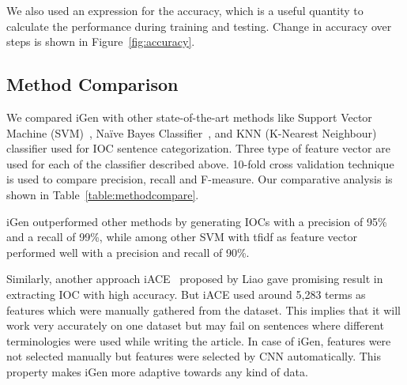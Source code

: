 We also used an expression for the accuracy, which is a useful quantity to calculate the performance during training and testing. Change in accuracy over steps is shown in Figure~\ref{fig:accuracy}.

\subsection{Method Comparison}



We compared iGen with other state-of-the-art methods like Support Vector Machine (SVM)~\cite{cortes}, Naïve Bayes Classifier~\cite{nir}, and KNN (K-Nearest Neighbour)~\cite{liao1} classifier used for IOC sentence categorization. Three type of feature vector are used for each of the classifier described above. 10-fold cross validation technique is used to compare precision, recall and F-measure. Our comparative analysis is shown in Table~\ref{table:methodcompare}.

iGen outperformed other methods by generating IOCs with a precision of 95\% and a recall of 99\%, while among other SVM with tfidf as feature vector performed well with a precision and recall of 90\%.

Similarly, another approach iACE~\cite{liao} proposed by Liao gave promising result in extracting IOC with high accuracy. But iACE used around 5,283 terms as features which were manually gathered from the dataset. This implies that it will work very accurately on one dataset but may fail on sentences where different terminologies were used while writing the article. In case of iGen, features were not selected manually but features were selected by CNN automatically. This property makes iGen more adaptive towards any kind of data. 
 

